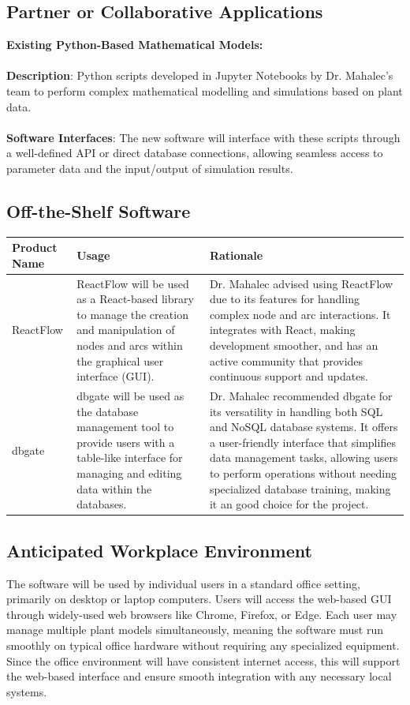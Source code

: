 \documentclass[12pt]{article}
\begin{document}
\subsection{Partner or Collaborative Applications}
\textbf{Existing Python-Based Mathematical Models:}\\\\
\textbf{Description}: Python scripts developed in Jupyter Notebooks by Dr. Mahalec’s team to perform complex mathematical modelling and simulations based on plant data.\\\\
\textbf{Software Interfaces}: The new software will interface with these scripts through a well-defined API or direct database connections, allowing seamless access to parameter data and the input/output of simulation results.

\subsection{Off-the-Shelf Software}
\noindent
\begin{tabularx}{\textwidth}{| X | X | X |}
    \hline
    \textbf{Product Name} & \textbf{Usage} & \textbf{Rationale} \\
    \hline
    ReactFlow & 
    ReactFlow will be used as a React-based library to manage the creation and manipulation of nodes and arcs within the graphical user interface (GUI). & 
    Dr. Mahalec advised using ReactFlow due to its features for handling complex node and arc interactions. It integrates with React, making development smoother, and has an active community that provides continuous support and updates.\\
    \hline
    dbgate & 
    dbgate will be used as the database management tool to provide users with a table-like interface for managing and editing data within the databases. & 
    Dr. Mahalec recommended dbgate for its versatility in handling both SQL and NoSQL database systems. It offers a user-friendly interface that simplifies data management tasks, allowing users to perform operations without needing specialized database training, making it an good choice for the project. \\
    \hline
\end{tabularx}
\subsection{Anticipated Workplace Environment}
The software will be used by individual users in a standard office setting, primarily on desktop or laptop computers. Users will access the web-based GUI through widely-used web browsers like Chrome, Firefox, or Edge. Each user may manage multiple plant models simultaneously, meaning the software must run smoothly on typical office hardware without requiring any specialized equipment. Since the office environment will have consistent internet access, this will support the web-based interface and ensure smooth integration with any necessary local systems.
\end{document}
